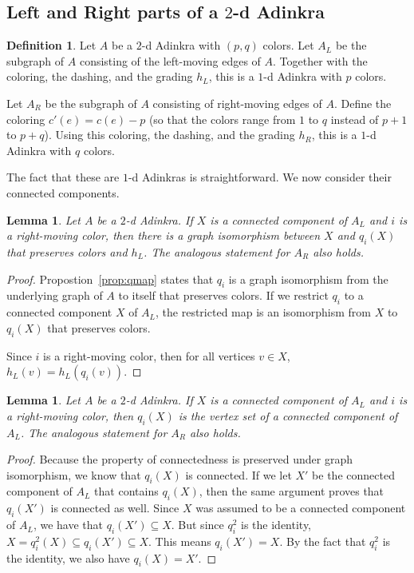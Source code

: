\documentclass[12pt,twoside,singlespace]{article}
\numberwithin{equation}{section}
\newtheorem{lem}[equation]{Lemma}
\theoremstyle{definition}
\newtheorem{definition}[equation]{Definition}
\begin{document}
\subsection{Left and Right parts of a $2$-d Adinkra}
\begin{definition}
Let $A$ be a $2$-d Adinkra with $(p,q)$ colors.  Let $A_L$ be the subgraph of $A$ consisting of the left-moving edges of $A$.  Together with the coloring, the dashing, and the grading $h_L$, this is a $1$-d Adinkra with $p$ colors.

Let $A_R$ be the subgraph of $A$ consisting of right-moving edges of $A$.  Define the coloring $c'(e)=c(e)-p$ (so that the colors range from $1$ to $q$ instead of $p+1$ to $p+q$).  Using this coloring, the dashing, and the grading $h_R$, this is a $1$-d Adinkra with $q$ colors.
\end{definition}
The fact that these are $1$-d Adinkras is straightforward.  We now consider their connected components.

\begin{lem}
\label{lem:qiso}
Let $A$ be a $2$-d Adinkra.  If $X$ is a connected component of $A_L$ and $i$ is a right-moving color, then there is a graph isomorphism between $X$ and $q_i(X)$ that preserves colors and $h_L$.  The analogous statement for $A_R$ also holds.
\end{lem}
\begin{proof}
Propostion~\ref{prop:qmap} states that $q_i$ is a graph isomorphism from the underlying graph of $A$ to itself that preserves colors.  If we restrict  $q_i$ to a connected component $X$ of $A_L$, the restricted map is an isomorphism from $X$ to $q_i(X)$ that preserves colors.

Since $i$ is a right-moving color, then for all vertices $v\in X$, $h_L(v)=h_L(q_i(v))$.
\end{proof}

\begin{lem}
\label{lem:qiconnected}
Let $A$ be a $2$-d Adinkra.  If $X$ is a connected component of $A_L$ and $i$ is a right-moving color, then $q_i(X)$ is the vertex set of a connected component of $A_L$. The analogous statement for $A_R$ also holds.
\end{lem}
\begin{proof}
Because the property of connectedness is preserved under graph isomorphism, we know that $q_i(X)$ is connected.  If we let $X'$ be the connected component of $A_L$ that contains $q_i(X)$, then the same argument proves that $q_i(X')$ is connected as well.  Since $X$ was assumed to be a connected component of $A_L$, we have that $q_i(X')\subseteq X$.  But since $q_i^2$ is the identity, $X=q_i^2(X)\subseteq q_i(X')\subseteq X$.  This means $q_i(X')=X$.  By the fact that $q_i^2$ is the identity, we also have $q_i(X)=X'$.
\end{proof}
\end{document}
